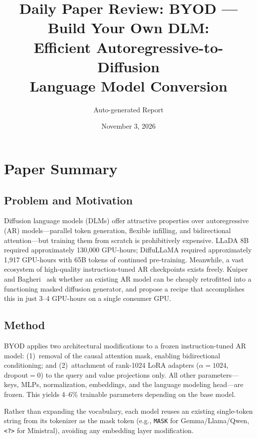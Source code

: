\documentclass[11pt,a4paper]{article}
\title{Daily Paper Review: BYOD --- Build Your Own DLM:\\Efficient Autoregressive-to-Diffusion\\Language Model Conversion}
\author{Auto-generated Report}
\date{November 3, 2026}
\begin{document}
\maketitle

\section{Paper Summary}

\subsection{Problem and Motivation}
Diffusion language models (DLMs) offer attractive properties over autoregressive (AR) models---parallel token generation, flexible infilling, and bidirectional attention---but training them from scratch is prohibitively expensive. LLaDA 8B required approximately 130{,}000 GPU-hours; DiffuLLaMA required approximately 1{,}917 GPU-hours with 65B tokens of continued pre-training. Meanwhile, a vast ecosystem of high-quality instruction-tuned AR checkpoints exists freely. Kuiper and Bagheri~\cite{kuiper2026byod} ask whether an existing AR model can be cheaply retrofitted into a functioning masked diffusion generator, and propose a recipe that accomplishes this in just 3--4 GPU-hours on a single consumer GPU.

\subsection{Method}
BYOD applies two architectural modifications to a frozen instruction-tuned AR model: (1)~removal of the causal attention mask, enabling bidirectional conditioning; and (2)~attachment of rank-1024 LoRA adapters ($\alpha{=}1024$, dropout${=}0$) to the query and value projections only. All other parameters---keys, MLPs, normalization, embeddings, and the language modeling head---are frozen. This yields 4--6\% trainable parameters depending on the base model.

Rather than expanding the vocabulary, each model reuses an existing single-token string from its tokenizer as the mask token (e.g., \texttt{MASK} for Gemma/Llama/Qwen, \texttt{<?>} for Ministral), avoiding any embedding layer modification.
\end{document}
